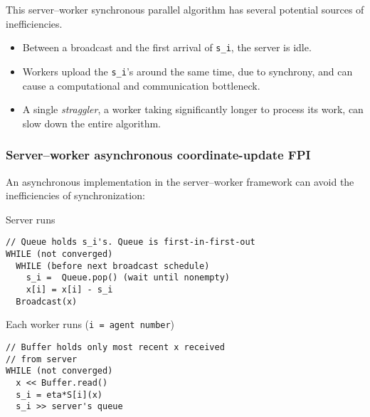 \documentclass[10pt,mathserif]{beamer}
\begin{document}
\begin{frame}[fragile]

This server--worker synchronous parallel algorithm has several potential sources of inefficiencies.
\begin{itemize}
    \item Between a broadcast and the first arrival of \verb!s_i!, the server is idle.
    \item Workers upload the \verb!s_i!'s around the same time, due to synchrony, and can cause a computational and communication bottleneck.
    \item A single \emph{straggler}, a worker taking significantly longer to process its work, can slow down the entire algorithm.
\end{itemize}


\end{frame}



\begin{frame}
\frametitle{Server--worker asynchronous coordinate-update FPI}

An asynchronous implementation in the server--worker framework can avoid the inefficiencies of synchronization:

\vspace{0.1in}
Server runs
\begin{lstlisting}
// Queue holds s_i's. Queue is first-in-first-out
WHILE (not converged)
  WHILE (before next broadcast schedule)
    s_i =  Queue.pop() (wait until nonempty)
    x[i] = x[i] - s_i
  Broadcast(x)
\end{lstlisting}

\vspace{0.1in}
Each worker runs (\verb|i = agent number|)
\begin{lstlisting}
// Buffer holds only most recent x received 
// from server
WHILE (not converged)
  x << Buffer.read()
  s_i = eta*S[i](x)
  s_i >> server's queue
\end{lstlisting}

\end{frame}
\end{document}
